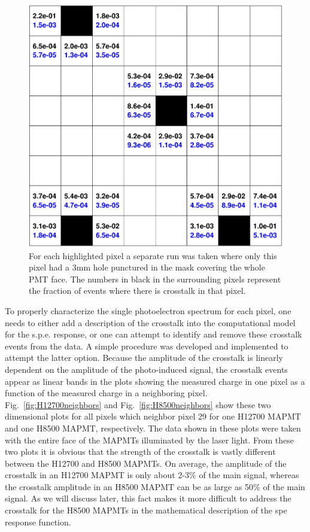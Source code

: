 \begin{figure}
	\centering
	\includegraphics[width=\linewidth]{figures/H12700_ct_ratio.png}
	\caption{For each highlighted pixel a separate run was taken where only this pixel had a 3mm hole punctured in the mask covering the whole PMT face. The numbers in black in the surrounding pixels represent the fraction of events where there is crosstalk in that pixel.}
	\label{fig:H12700_ct_ratio}
\end{figure}

To properly characterize the single photoelectron spectrum for each pixel, one needs to either add a description of the crosstalk into the computational model for the s.p.e. response, or one can attempt to identify and remove these crosstalk events from the data. A simple procedure was developed and implemented to attempt the latter option. Because the amplitude of the crosstalk is linearly dependent on the amplitude of the photo-induced signal, the crosstalk events appear as linear bands in the plots showing the measured charge in one pixel as a function of the measured charge in a neighboring pixel. Fig.~\ref{fig:H12700neighbors} and Fig.~\ref{fig:H8500neighbors} show these two dimensional plots for all pixels which neighbor pixel 29 for one H12700 MAPMT and one H8500 MAPMT, respectively. The data shown in these plots were taken with the entire face of the MAPMTs illuminated by the laser light. From these two plots it is obvious that the strength of the crosstalk is vastly different between the H12700 and H8500 MAPMTs. On average, the amplitude of the crosstalk in an H12700 MAPMT is only about 2-3$\%$ of the main signal, whereas the crosstalk amplitude in an H8500 MAPMT can be as large as 50$\%$ of the main signal. As we will discuss later, this fact makes it more difficult to address the crosstalk for the H8500 MAPMTs in the mathematical description of the spe response function.

